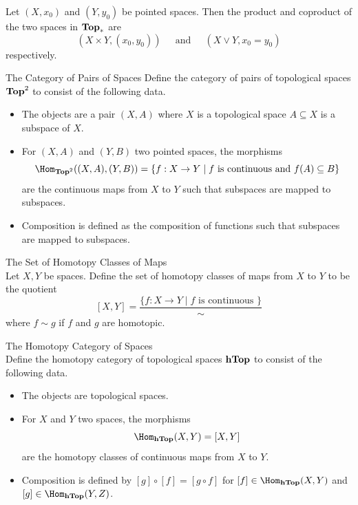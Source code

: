 \documentclass[a4paper]{article}
\begin{document}
\begin{prp}{}{} Let $(X,x_0)$ and $(Y,y_0)$ be pointed spaces. Then the product and coproduct of the two spaces in $\bold{Top}_\ast$ are $$(X\times Y,(x_0,y_0))\;\;\;\;\text{ and }\;\;\;\;(X\vee Y,x_0=y_0)$$ respectively. 
\end{prp}

\begin{defn}{The Category of Pairs of Spaces}{} Define the category of pairs of topological spaces $\bold{Top}^2$ to consist of the following data. 
\begin{itemize}
\item The objects are a pair $(X,A)$ where $X$ is a topological space $A\subseteq X$ is a subspace of $X$. 
\item For $(X,A)$ and $(Y,B)$ two pointed spaces, the morphisms $$\Hom_{\bold{Top}^2}((X,A),(Y,B))=\{f:X\to Y\;|\;f\text{ is continuous and }f(A)\subseteq B\}$$ are the continuous maps from $X$ to $Y$ such that subspaces are mapped to subspaces. 
\item Composition is defined as the composition of functions such that subspaces are mapped to subspaces. 
\end{itemize}
\end{defn}

\begin{defn}{The Set of Homotopy Classes of Maps}{}\\
Let $X,Y$ be spaces. Define the set of homotopy classes of maps from $X$ to $Y$ to be the quotient $$[X,Y]=\frac{\{f:X\to Y\;|\;f\text{ is continuous }\}}{\sim}$$ where $f\sim g$ if $f$ and $g$ are homotopic. 
\end{defn}

\begin{defn}{The Homotopy Category of Spaces}{}\\
Define the homotopy category of topological spaces $\bold{hTop}$ to consist of the following data. 
\begin{itemize}
\item The objects are topological spaces. 
\item For $X$ and $Y$ two spaces, the morphisms $$\Hom_{\bold{hTop}}(X,Y)=[X,Y]$$ are the homotopy classes of continuous maps from $X$ to $Y$. 
\item Composition is defined by $[g]\circ[f]=[g\circ f]$ for $[f]\in\Hom_{\bold{hTop}}(X,Y)$ and $[g]\in\Hom_{\bold{hTop}}(Y,Z)$. 
\end{itemize}
\end{defn}
\end{document}
